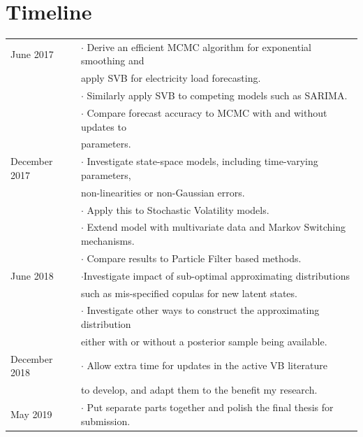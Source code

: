 \documentclass[12pt,a4paper]{article}%
\numberwithin{equation}{section}
\begin{document}
\section{Timeline} \label{sec:Timeline}

\begin{tabular}{|l|l|}
\hline
  June 2017 & $\cdot$ Derive an efficient MCMC algorithm for exponential smoothing and \\
  & apply SVB for electricity load forecasting. \\
  & $\cdot$ Similarly apply SVB to competing models such as SARIMA. \\
  & $\cdot$ Compare forecast accuracy to MCMC with and without updates to \\
  & parameters. \\ \hline
  December 2017 & $\cdot$ Investigate state-space models, including time-varying parameters, \\
  & non-linearities or non-Gaussian errors. \\
  & $\cdot$ Apply this to Stochastic Volatility models. \\
  & $\cdot$ Extend model with multivariate data and Markov Switching mechanisms.\\
  & $\cdot$ Compare results to Particle Filter based methods. \\  \hline
  June 2018 & $\cdot$Investigate impact of sub-optimal approximating distributions  \\
  & such as mis-specified copulas for new latent states. \\
  & $\cdot$ Investigate other ways to construct the approximating distribution  \\
  & either with or without a posterior sample being available. \\  \hline
  December 2018 & $\cdot$ Allow extra time for updates in the active VB literature  \\
  & to develop, and adapt them to the benefit my research. \\  \hline
  May 2019 & $\cdot$ Put separate parts together and polish the final thesis for submission. \\
\hline
\end{tabular}



\end{document}
